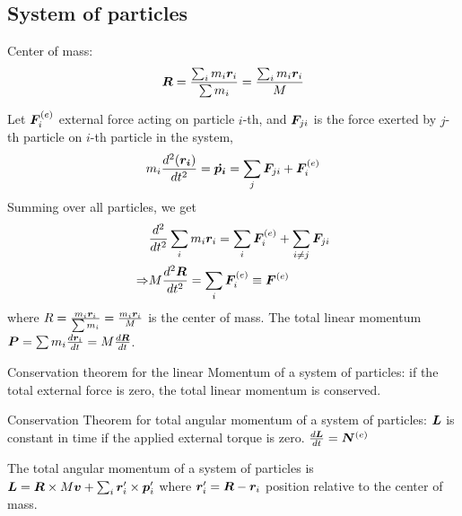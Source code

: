 \documentclass[12pt]{article}
\begin{document}
\subsection{System of particles}
Center of mass: $$\boldsymbol{R} = \frac{\sum_i m_i \boldsymbol{r}_i}{\sum m_i} =  \frac{\sum_i m_i \boldsymbol{r}_i}{M}$$

Let $\boldsymbol{F}^{(e)}_i$ external force acting on particle $i$-th, and $\boldsymbol{F}_{ji}$ is the force 
exerted by $j$-th particle on $i$-th particle in the system, 
$$  m_i \frac{d^2(\boldsymbol{r_i})}{dt^2} = \boldsymbol{\dot{p_i}} = \sum_{j} \boldsymbol{F}_{ji} +  \boldsymbol{F}^{(e)}_i  $$
Summing over all particles, we get  \begin{align}
	& \frac{d^2}{dt^2} \sum_i m_i \boldsymbol{r}_i = \sum_i \boldsymbol{F}^{(e)}_i + \sum_{i \neq j} \boldsymbol{F}_{ji} \\
	\Rightarrow & M \frac{d^2 \boldsymbol{R}}{dt^2} = \sum_i \boldsymbol{F}^{(e)}_i \equiv \boldsymbol{F}^{(e)}
\end{align}
where $R = \frac{m_i \boldsymbol{r}_i}{\sum m_i} =  \frac{m_i \boldsymbol{r}_i}{M}$ is the center of mass.
The total linear momentum $\boldsymbol{P} = \sum m_i \frac{d\boldsymbol{r}_i}{dt} = M \frac{d\boldsymbol{R}}{dt}$.

Conservation theorem for the linear Momentum of a system of particles: 
if the total external force is zero, the total linear momentum is conserved.

Conservation Theorem for total angular momentum of a system of particles: $\boldsymbol{L}$ is constant in time 
if the applied external torque is zero. $\frac{d\boldsymbol{L}}{dt} = \boldsymbol{N}^{(e)}$

The total angular momentum of a system of particles is $\boldsymbol{L} = \boldsymbol{R} \times M \boldsymbol{v} + \sum_i \boldsymbol{r}_i' \times \boldsymbol{p}_i'$ 
where $\boldsymbol{r}_i' = \boldsymbol{R} - \boldsymbol{r}_i$ position relative to the center of mass.
\end{document}
